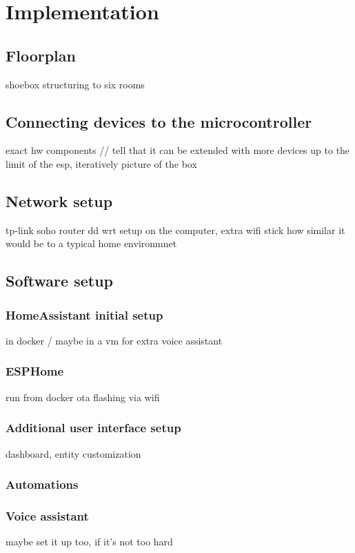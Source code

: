 \chapter{Implementation}

\section{Floorplan}
shoebox structuring to six rooms
\section{Connecting devices to the microcontroller}
exact hw components
// tell that it can be extended with more devices up to the limit of the esp, iteratively
picture of the box
\section{Network setup}
tp-link soho router
dd wrt
setup on the computer, extra wifi stick
how similar it would be to a typical home environmnet
\section{Software setup}
\subsection{HomeAssistant initial setup}
in docker / maybe in a vm for extra voice assistant
\subsection{ESPHome}
run from docker
ota flashing via wifi
\subsection{Additional user interface setup}
dashboard, entity customization
\subsection{Automations}
\subsection{Voice assistant}
maybe set it up too, if it's not too hard
